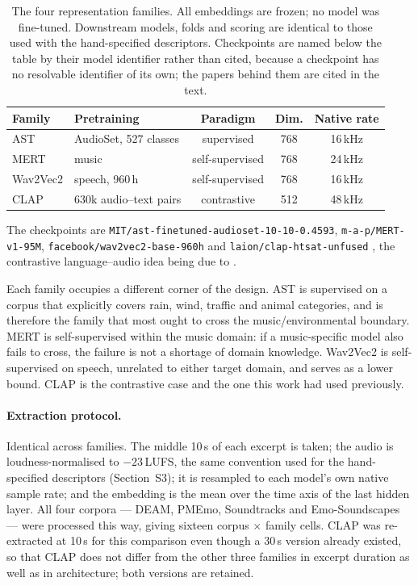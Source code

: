 \begin{table}[htbp]
\centering\small
\caption{The four representation families. All embeddings are frozen; no model was
fine-tuned. Downstream models, folds and scoring are identical to those used with the
hand-specified descriptors. Checkpoints are named below the table by their model
identifier rather than cited, because a checkpoint has no resolvable identifier of
its own; the papers behind them are cited in the text.}
\begin{tabular}{llccc}
\toprule
Family & Pretraining & Paradigm & Dim. & Native rate \\
\midrule
AST      & AudioSet, 527 classes & supervised & 768 & 16\,kHz \\
MERT     & music                 & self-supervised & 768 & 24\,kHz \\
Wav2Vec2 & speech, 960\,h        & self-supervised & 768 & 16\,kHz \\
CLAP     & 630k audio--text pairs & contrastive & 512 & 48\,kHz \\
\bottomrule
\end{tabular}
\end{table}

The checkpoints are \texttt{MIT/ast-finetuned-audioset-10-10-0.4593},
\texttt{m-a-p/MERT-v1-95M}, \texttt{facebook/wav2vec2-base-960h} and
\texttt{laion/clap-htsat-unfused} \cite{wu2023clap}, the contrastive
language--audio idea being due to \cite{wu2023clap}.

Each family occupies a different corner of the design. AST is supervised on a corpus
that explicitly covers rain, wind, traffic and animal categories, and is therefore the
family that most ought to cross the music/environmental boundary. MERT is
self-supervised within the music domain: if a music-specific model also fails to cross,
the failure is not a shortage of domain knowledge. Wav2Vec2 is self-supervised on
speech, unrelated to either target domain, and serves as a lower bound. CLAP is the
contrastive case and the one this work had used previously.

\paragraph{Extraction protocol.}
Identical across families. The middle 10\,s of each excerpt is taken; the audio is
loudness-normalised to $-23$\,LUFS, the same convention used for the hand-specified
descriptors (Section~S3); it is resampled to each model's own native sample rate; and
the embedding is the mean over the time axis of the last hidden layer. All four
corpora --- DEAM, PMEmo, Soundtracks and Emo-Soundscapes --- were processed this way,
giving sixteen corpus $\times$ family cells. CLAP was re-extracted at 10\,s for this
comparison even though a 30\,s version already existed, so that CLAP does not differ
from the other three families in excerpt duration as well as in architecture; both
versions are retained.

